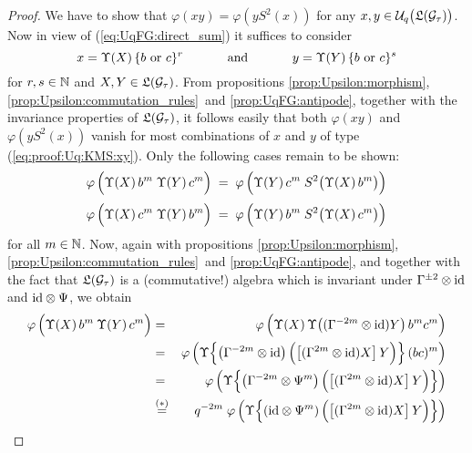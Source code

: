 \begin{proof}
We have to show that $\varphi(xy) = \varphi(y S^2(x))$ for any $x,y \in \UqTG$.
Now in view of (\ref{eq:UqFG:direct_sum}) it suffices to consider
\begin{equation}\label{eq:proof:Uq:KMS:xy}
   x=\Upsilon(X)\, \{ b \mbox{ or } c \}^r  \andspace{3.5em}
   y=\Upsilon(Y)\, \{ b \mbox{ or } c \}^s
\end{equation}
for $r,s\in\NN$ and $X,Y \in \TG$.
From propositions \ref{prop:Upsilon:morphism},
\ref{prop:Upsilon:commutation_rules}\ and \ref{prop:UqFG:antipode},
together with the invariance properties of $\TG$, it follows easily that
both $\varphi(xy)$ and $\varphi(y S^2(x))$ vanish for most
combinations of $x$ and $y$ of type (\ref{eq:proof:Uq:KMS:xy}).
Only the following cases remain to be shown:
\begin{equation}\label{eq:proof:Uq:KMS:bc}
       \varphi\left(\Upsilon(X)\,b^m\; \Upsilon(Y)\,c^m      \vertL \right)
   \;=\; \varphi\left(\Upsilon(Y)\,c^m\;
                 S^2\!\left(\Upsilon(X)\,b^m \vertM \right) \! \vertL \right)
\end{equation}
\begin{equation}\label{eq:proof:Uq:KMS:cb}
   \varphi\left(\Upsilon(X)\,c^m\; \Upsilon(Y)\,b^m          \vertL \right)
   \;=\; \varphi\left(\Upsilon(Y)\,b^m\;
                 S^2\!\left(\Upsilon(X)\,c^m \vertM \right) \! \vertL \right)
\end{equation}
for all $m\in\NN$. Now, again with propositions \ref{prop:Upsilon:morphism},
\ref{prop:Upsilon:commutation_rules}\ and \ref{prop:UqFG:antipode},
and together with the fact that $\TG$ is a (commutative!) algebra
which is invariant under $\Gamma^{\pm 2} \tens \id$ and $\id \tens \Psi$, we obtain
\begin{eqnarray*}
\varphi\left(\Upsilon(X)\,b^m\: \Upsilon(Y)\,c^m  \vertL \right)
&=&
\varphi\left(\Upsilon(X)\,\Upsilon \!\left((\Gamma^{-2m} \tens \id)Y\right) b^m c^m  \vertL \right)
\\ &=&
\varphi\left(\Upsilon \!\left\{\left(\Gamma^{-2m} \tens \id \right) \left(
       \left[(\Gamma^{2m} \tens \id)X\right] Y \vertL \right)\right\}  (bc)^m \right)
\\ &=&
\varphi\left(\Upsilon \!\left\{\left(\Gamma^{-2m} \tens \Psi^m \right) \left(
       \left[(\Gamma^{2m} \tens \id)X\right] Y \vertL \right)\right\} \right)
\\ &\stackrel{(*)}{=}&
q^{-2m}\; \varphi\left(\Upsilon \!\left\{\left(\id \tens \Psi^m \right) \left(
       \left[(\Gamma^{2m} \tens \id)X\right] Y \vertL \right)\right\} \right)

\end{eqnarray*}
\end{proof}
